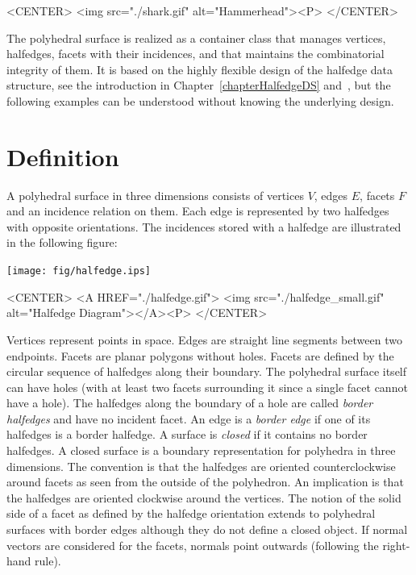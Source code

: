 \begin{ccHtmlOnly}
    <CENTER>
        <img src="./shark.gif" alt="Hammerhead"><P>
    </CENTER>
\end{ccHtmlOnly}

The polyhedral surface is realized as a container class that manages
vertices, halfedges, facets with their incidences, and that maintains
the combinatorial integrity of them. It is based on the highly
flexible design of the halfedge data structure, see the introduction
in Chapter~\ref{chapterHalfedgeDS} and~\cite{k-ugpdd-99}, but the
following examples can be understood without knowing the underlying
design.

\section{Definition}
  
A polyhedral surface  in three dimensions
consists of vertices $V$, edges $E$, facets $F$ and an incidence
relation on them.  Each edge is represented by two halfedges with
opposite orientations. The incidences stored with a halfedge are
illustrated in the following figure:

\begin{ccTexOnly}
    \vspace{-7mm}
    \begin{center}
      \parbox{0.4\textwidth}{%
          \texttt{[image: fig/halfedge.ips]}%
      }
    \end{center}
    \vspace{-5mm}
\end{ccTexOnly}

\begin{ccHtmlOnly}
    <CENTER>
    <A HREF="./halfedge.gif">
        <img src="./halfedge_small.gif" alt="Halfedge Diagram"></A><P>
    </CENTER>
\end{ccHtmlOnly}

Vertices represent points in space. Edges are straight line segments
between two endpoints. Facets are planar polygons without
holes. Facets are defined by the circular sequence of halfedges along
their boundary.  The polyhedral surface itself can have holes (with at
least two facets surrounding it since a single facet cannot have a
hole). The halfedges along the boundary of a hole are called {\em
border halfedges\/} and have no incident facet. An edge is a {\em
border edge\/} if one of its halfedges is a border halfedge.  A
surface is {\em closed\/} if it contains no border halfedges. A closed
surface is a boundary representation for polyhedra in three
dimensions. The convention is that the halfedges are oriented
counterclockwise around facets as seen from the outside of the
polyhedron. An implication is that the halfedges are oriented
clockwise around the vertices. The notion of the solid side of a facet
as defined by the halfedge orientation extends to polyhedral surfaces
with border edges although they do not define a closed object. If
normal vectors are considered for the facets, normals point outwards
(following the right-hand rule).

